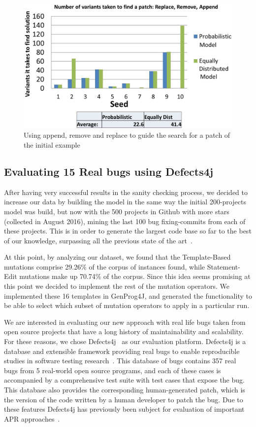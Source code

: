 \documentclass[conference]{IEEEtran}
\begin{document}
\begin{figure}[!h]
  \centering
    \includegraphics[scale=0.25]{sanity4}
  \caption{Using append, remove and replace to guide the search for a patch of 
the initial example}
  \label{fig:resultsARR}
\end{figure}

\subsection{Evaluating 15 Real bugs using Defects4j}
After having very successful results in the sanity checking process, we decided 
to increase our data by building the model in the same way the initial 200-projects model was build, but now with the 500 projects in Github with more 
stars (collected in August 2016), mining the last 100 bug fixing-commits from each of these projects. This is in order to generate the largest code base so far to the best 
of our knowledge, surpassing all the previous state of the 
art~\cite{long15,Soto15,zhong15,matias15,xuan16}. 

At this point, by analyzing our dataset, 
we found that the Template-Based mutations comprise 29.26\% of the corpus of 
instances found, while Statement-Edit mutations make up 70.74\% of the 
corpus. Since this idea seems promising at this point we decided to implement the rest 
of the mutation operators. We implemented these 16 templates in GenProg4J, and generated the functionality 
to be able to select which subset of mutation operators to apply in a particular 
run.

We are interested in evaluating our new approach with real life bugs taken from 
open source projects that have a long history of maintainability and 
scalability. For these reasons, we chose Defects4j~\cite{just14} as our 
evaluation platform. Defects4j is a database and extensible 
framework providing real bugs to enable reproducible studies in software testing 
research~\cite{just14}. This database of bugs contains 357 real bugs from 5 
real-world open source programs, and each of these cases is accompanied by a 
comprehensive test suite with test cases that expose the bug. This database also provides 
the corresponding human-generated patch, which is the version of the code written by a human 
developer to patch the bug. Due to these features Defects4j has previously been 
subject for evaluation of important APR approaches~\cite{Durieux15}.
\end{document}
